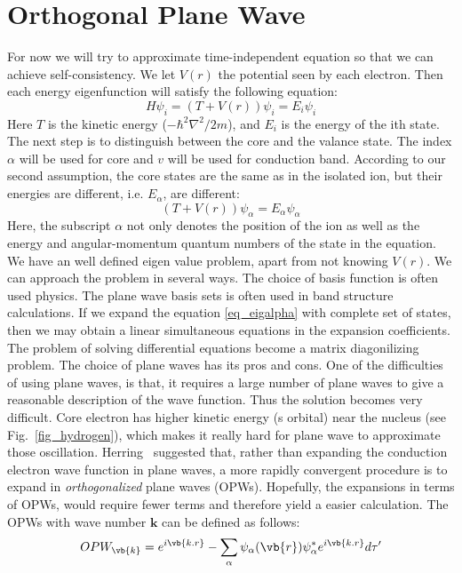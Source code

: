 \chapter{Orthogonal Plane Wave}\label{app_opw}

For now we will try to approximate time-independent \schrod equation so that we can achieve self-consistency. We let $V(r)$ the potential seen by each electron. Then each energy eigenfunction will satisfy the following equation:
\begin{equation}
\label{eigeqn}
H\psi_i = (T+V(r))\psi_i = E_i\psi_i 
\end{equation}
Here $T$ is the kinetic energy ($-\hbar^2\nabla^2/2m$), and $E_i$ is the energy of the ith state. The next step is to distinguish between the core and the valance state. The index $\alpha$ will be used for core and $v$ will be used for conduction band. According to our second assumption, the core states are the same as in the isolated ion, but their energies are different, i.e. $E_\alpha$, are different:
\begin{equation}
\label{eq_eigalpha}
(T+V(r))\psi_\alpha = E_\alpha \psi_\alpha
\end{equation}
Here, the subscript $\alpha$ not only denotes the position of the ion as well as the energy and angular-momentum quantum numbers of the state in the equation. We have an well defined eigen value problem, apart from not knowing $V(r)$. We can approach the problem in several ways. The choice of basis function is often used physics. The plane wave basis sets is often used in band structure calculations. If we expand the \schrod equation \ref{eq_eigalpha} with complete set of states,  then we may obtain a linear simultaneous equations in the expansion coefficients. The problem of  solving differential equations become a matrix diagonilizing problem. The choice of plane waves has its pros and cons. One of the difficulties of using plane waves, is that, it requires a large number of plane waves to give a reasonable description of the wave function. Thus the solution becomes very difficult. Core electron has higher kinetic energy (s orbital) near the nucleus (see Fig.~\ref{fig_hydrogen}), which makes it really hard for plane wave to approximate those oscillation. Herring~\cite{herring1940new} suggested that, rather than expanding the conduction electron wave function in plane waves, a more rapidly convergent procedure is to expand in \textit{orthogonalized} plane waves (OPWs). Hopefully, the expansions in terms of OPWs, would require fewer terms and therefore yield a easier calculation. The OPWs with wave number $\mathbf{k}$ can be defined as follows:
\begin{equation}
\label{eq_opw}
OPW_{\vb{k}} = e^{i\vb{k.r}} - \sum_{\alpha} \psi_{\alpha}(\vb{r}) \psi^{\ast}_{\alpha} e^{i{\vb{k.r}}} d\tau'
\end{equation}

